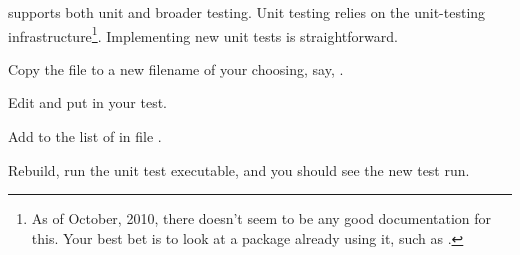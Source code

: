 \muelu supports both unit and broader testing.  Unit testing relies on the \teuchos unit-testing infrastructure\footnote{As of
October, 2010, there
doesn't seem to be any good documentation for this.  Your best bet is to look at a package already using it, such as .}.
Implementing new unit tests is straightforward.
\be
  \item Copy the file  to a new filename of your choosing, say, .
  \item Edit  and put in your test.
  \item Add  to the list of  in file .
  \item Rebuild, run the unit test executable, and you should see the new test run.
\ee
